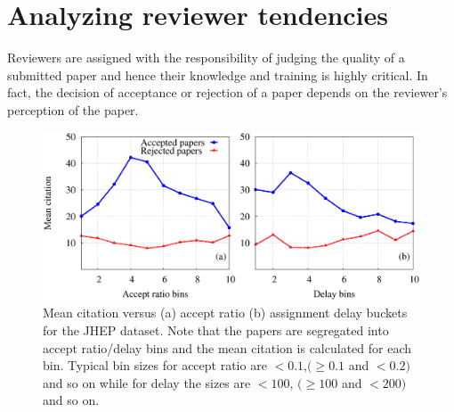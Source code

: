 \noindent
\section{Analyzing reviewer tendencies}
\label{reviewer}
Reviewers are assigned with the responsibility of judging the quality of a submitted paper and hence their knowledge and training is highly critical. 
In fact, the decision of acceptance or rejection of a paper depends on the reviewer's perception of the paper. 





\begin{figure}
 \centering
 \includegraphics[scale = 0.3]{./texfiles/Chapter_4/cikm_17/figures/citation_delay_acpt_ratio_jhep.eps}
 \caption{\label{a_d_jhep} Mean citation versus (a) accept ratio (b) assignment delay buckets for the JHEP dataset. 
 Note that the papers are segregated into accept ratio/delay bins and the mean citation is calculated for each bin. 
 Typical bin sizes for accept ratio are $<0.1$,$(\geq 0.1$ and $<0.2)$ and so on while for delay the sizes are $<100$, $(\geq 100$ and $< 200)$ and so on.\vspace{4mm}}
\end{figure}

